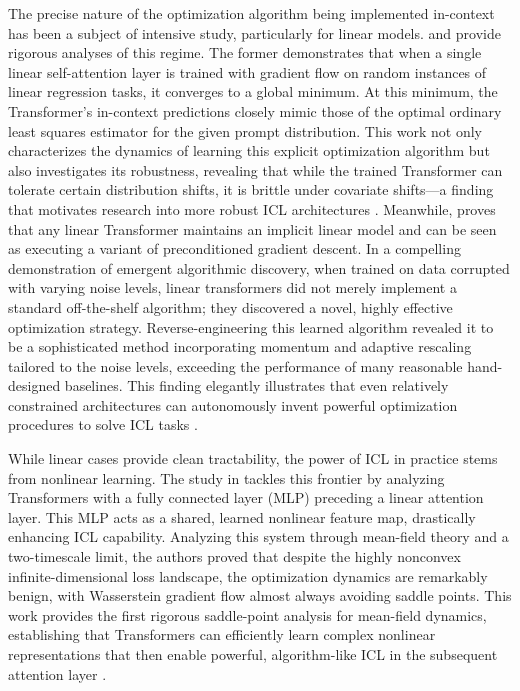 \documentclass[11pt]{article}
\begin{document}
The precise nature of the optimization algorithm being implemented in-context has been a subject of intensive study, particularly for linear models. \cite{ref14} and \cite{ref15} provide rigorous analyses of this regime. The former demonstrates that when a single linear self-attention layer is trained with gradient flow on random instances of linear regression tasks, it converges to a global minimum. At this minimum, the Transformer's in-context predictions closely mimic those of the optimal ordinary least squares estimator for the given prompt distribution. This work not only characterizes the dynamics of learning this explicit optimization algorithm but also investigates its robustness, revealing that while the trained Transformer can tolerate certain distribution shifts, it is brittle under covariate shifts---a finding that motivates research into more robust ICL architectures \cite{ref14}. Meanwhile, \cite{ref15} proves that any linear Transformer maintains an implicit linear model and can be seen as executing a variant of preconditioned gradient descent. In a compelling demonstration of emergent algorithmic discovery, when trained on data corrupted with varying noise levels, linear transformers did not merely implement a standard off-the-shelf algorithm; they discovered a novel, highly effective optimization strategy. Reverse-engineering this learned algorithm revealed it to be a sophisticated method incorporating momentum and adaptive rescaling tailored to the noise levels, exceeding the performance of many reasonable hand-designed baselines. This finding elegantly illustrates that even relatively constrained architectures can autonomously invent powerful optimization procedures to solve ICL tasks \cite{ref15}.

While linear cases provide clean tractability, the power of ICL in practice stems from nonlinear learning. The study in \cite{ref16} tackles this frontier by analyzing Transformers with a fully connected layer (MLP) preceding a linear attention layer. This MLP acts as a shared, learned nonlinear feature map, drastically enhancing ICL capability. Analyzing this system through mean-field theory and a two-timescale limit, the authors proved that despite the highly nonconvex infinite-dimensional loss landscape, the optimization dynamics are remarkably benign, with Wasserstein gradient flow almost always avoiding saddle points. This work provides the first rigorous saddle-point analysis for mean-field dynamics, establishing that Transformers can efficiently learn complex nonlinear representations that then enable powerful, algorithm-like ICL in the subsequent attention layer \cite{ref16}.
\end{document}
